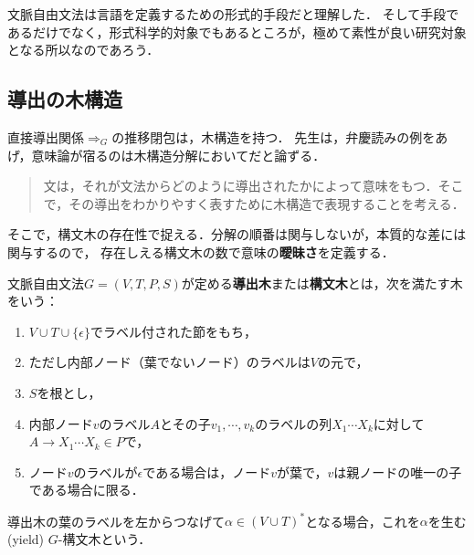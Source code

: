 \begin{screen}
    文脈自由文法は言語を定義するための形式的手段だと理解した．
    そして手段であるだけでなく，形式科学的対象でもあるところが，極めて素性が良い研究対象となる所以なのであろう．
\end{screen}

\subsection{導出の木構造}

\begin{tcolorbox}[colframe=ForestGreen, colback=ForestGreen!10!white, breakable]
    直接導出関係$\Rightarrow_G$の推移閉包は，木構造を持つ．
    先生は，弁慶読みの例をあげ，意味論が宿るのは木構造分解においてだと論ずる．
    \begin{quote}
        文は，それが文法からどのように導出されたかによって意味をもつ．そこで，その導出をわかりやすく表すために木構造で表現することを考える．
    \end{quote}
    そこで，構文木の存在性で捉える．分解の順番は関与しないが，本質的な差には関与するので，
    存在しえる構文木の数で意味の\textbf{曖昧さ}を定義する．
\end{tcolorbox}

\begin{definition}
    文脈自由文法$G=(V,T,P,S)$が定める\textbf{導出木}または\textbf{構文木}とは，次を満たす木をいう：
    \begin{enumerate}
        \item $V\cup T\cup\{\epsilon\}$でラベル付された節をもち，
        \item ただし内部ノード（葉でないノード）のラベルは$V$の元で，
        \item $S$を根とし，
        \item 内部ノード$v$のラベル$A$とその子$v_1,\cdots,v_k$のラベルの列$X_1\cdots X_k$に対して$A\rightarrow X_1\cdots X_k\in P$で，
        \item ノード$v$のラベルが$\epsilon$である場合は，ノード$v$が葉で，$v$は親ノードの唯一の子である場合に限る．
    \end{enumerate}
    導出木の葉のラベルを左からつなげて$\alpha\in (V\cup T)^*$となる場合，これを$\alpha$を生む(yield) $G$-構文木という．
\end{definition}


